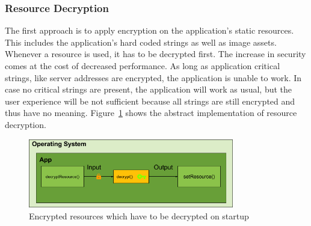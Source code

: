 \subsubsection{Resource Decryption} \label{subsection:counter-replace-encryption-content-resource}
The first approach is to apply encryption on the application's static resources.
This includes the application's hard coded strings as well as image assets.
Whenever a resource is used, it has to be decrypted first.
The increase in security comes at the cost of decreased performance.
As long as application critical strings, like server addresses are encrypted, the application is unable to work.
In case no critical strings are present, the application will work as usual, but the user experience will be not sufficient because all strings are still encrypted and thus have no meaning.
Figure~\ref{fig:encryptionResource} shows the abstract implementation of resource decryption.
\begin{figure}[h]
    \centering
    \includegraphics[width=0.8\textwidth]{data/encryptionResource.png}
    \caption{Encrypted resources which have to be decrypted on startup}
    \label{fig:encryptionResource}
\end{figure}
